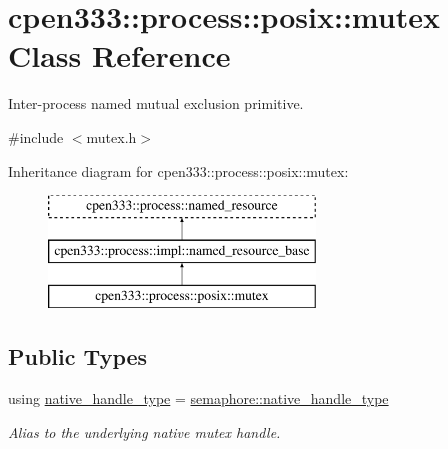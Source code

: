 \hypertarget{classcpen333_1_1process_1_1posix_1_1mutex}{}\section{cpen333\+:\+:process\+:\+:posix\+:\+:mutex Class Reference}
\label{classcpen333_1_1process_1_1posix_1_1mutex}


Inter-\/process named mutual exclusion primitive.  




{\ttfamily \#include $<$mutex.\+h$>$}

Inheritance diagram for cpen333\+:\+:process\+:\+:posix\+:\+:mutex\+:\begin{figure}[H]
\begin{center}
\leavevmode
\includegraphics[height=3.000000cm]{classcpen333_1_1process_1_1posix_1_1mutex}
\end{center}
\end{figure}
\subsection*{Public Types}
\begin{DoxyCompactItemize}
\item 
\mbox{\label{classcpen333_1_1process_1_1posix_1_1mutex_aac6d3675fcffc52ddf281e952968e44b}} 
using \hyperlink{classcpen333_1_1process_1_1posix_1_1mutex_aac6d3675fcffc52ddf281e952968e44b}{native\+\_\+handle\+\_\+type} = \hyperlink{classcpen333_1_1process_1_1posix_1_1semaphore_ad63150e5c8c196a84a7b214462756f1a}{semaphore\+::native\+\_\+handle\+\_\+type}
\begin{DoxyCompactList}\small\item\em Alias to the underlying native mutex handle. \end{DoxyCompactList}\end{DoxyCompactItemize}
